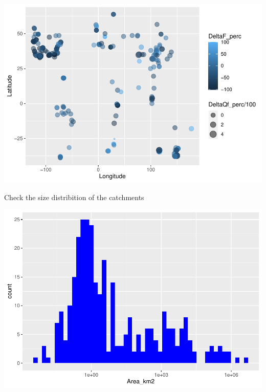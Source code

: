 \documentclass[]{elsarticle} %
\newenvironment{Shaded}{\begin{snugshade}}{\end{snugshade}}
\newcommand{\DataTypeTok}[1]{\textcolor[rgb]{0.13,0.29,0.53}{#1}}
\newcommand{\DecValTok}[1]{\textcolor[rgb]{0.00,0.00,0.81}{#1}}
\newcommand{\KeywordTok}[1]{\textcolor[rgb]{0.13,0.29,0.53}{\textbf{#1}}}
\newcommand{\NormalTok}[1]{#1}
\newcommand{\OperatorTok}[1]{\textcolor[rgb]{0.81,0.36,0.00}{\textbf{#1}}}
\newcommand{\StringTok}[1]{\textcolor[rgb]{0.31,0.60,0.02}{#1}}
\begin{document}
\includegraphics{Forest_and_Water_files/figure-latex/unnamed-chunk-20-1.pdf}

Check the size distribition of the catchments

\begin{Shaded}
\end{Shaded}

\includegraphics{Forest_and_Water_files/figure-latex/unnamed-chunk-21-1.pdf}
\end{document}
